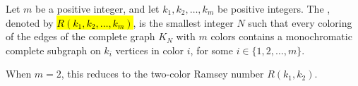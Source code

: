 \begin{definition} \label{definition:multicolor_ramsey_number}
Let $m$ be a positive integer, and let $k_1, k_2, \dots, k_m$ be positive integers. The , denoted by \hl{$R(k_1, k_2, \dots, k_m)$}, is the smallest integer $N$ such that every coloring of the edges of the complete graph $K_N$ with $m$ colors contains a monochromatic complete subgraph on $k_i$ vertices in color $i$, for some $i \in \{1, 2, \dots, m\}$.

When $m = 2$, this reduces to the two-color Ramsey number $R(k_1, k_2)$.
\end{definition}
